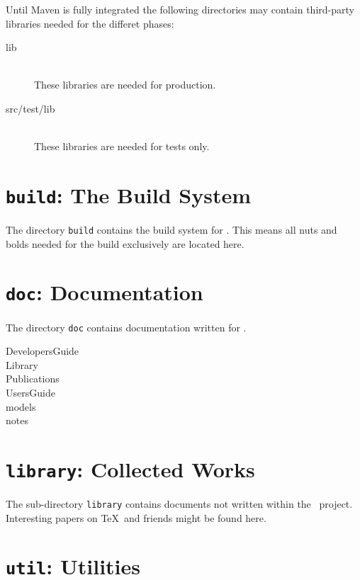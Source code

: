 Until Maven is fully integrated the following directories may contain
third-party libraries needed for the differet phases:



\begin{description}
\item[lib] \ \\
  These libraries are needed for production.
\item[src/test/lib] \ \\
  These libraries are needed for tests only.
\end{description}


\section{\texttt{build}: The Build System}

The directory \texttt{build} contains the build system for \ExTeX.
This means all nuts and bolds needed for the build exclusively are
located here.


\section{\texttt{doc}: Documentation}

The directory \texttt{doc} contains documentation written for \ExTeX.

\begin{description}
\item[DevelopersGuide] 
\item[Library] 
\item[Publications] 
\item[UsersGuide] 
\item[models] 
\item[notes] 
\end{description}


\section{\texttt{library}: Collected Works}

The sub-directory \texttt{library} contains documents not written
within the \ExTeX\ project. Interesting papers on \TeX\ and friends
might be found here.



\section{\texttt{util}: Utilities}

